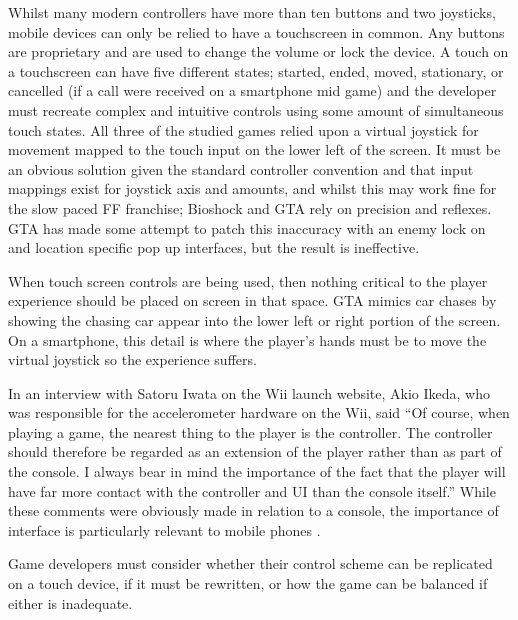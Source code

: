\documentclass{scrartcl}
\begin{document}
{Whilst many modern controllers have more than ten buttons and two joysticks, mobile devices can only be relied to have a touchscreen in common. Any buttons are proprietary and are used to change the volume or lock the device.  A touch on a touchscreen can have five different states; started, ended, moved, stationary, or cancelled (if a call were received on a smartphone mid game) and the developer must recreate complex and intuitive controls using some amount of simultaneous touch states. All three of the studied games relied upon a virtual joystick for movement mapped to the touch input on the lower left of the screen. It must be an obvious solution given the standard controller convention and that input mappings exist for joystick axis and amounts, and whilst this may work fine for the slow paced FF franchise; Bioshock and GTA rely on precision and reflexes.  GTA has made some attempt to patch this inaccuracy with an enemy lock on and location specific pop up interfaces, but the result is ineffective.

When touch screen controls are being used, then nothing critical to the player experience should be placed on screen in that space. GTA mimics car chases by showing the chasing car appear into the lower left or right portion of the screen. On a smartphone, this detail is where the player's hands must be to move the virtual joystick so the experience suffers.

In an interview with Satoru Iwata on the Wii launch website, Akio Ikeda, who was responsible for the accelerometer hardware on the Wii, said ``Of course, when playing a game, the nearest thing to the player is the controller. The controller should therefore be regarded as an extension of the player rather than as part of the console. I always bear in mind the importance of the fact that the player will have far more contact with the controller and UI than the console itself.'' While these comments were obviously made in relation to a console, the importance of interface is particularly relevant to mobile phones \cite {gilbertson2008using}.

Game developers must consider whether their control scheme can be replicated on a touch device, if it must be rewritten, or how the game can be balanced if either is inadequate.

}
\end{document}
